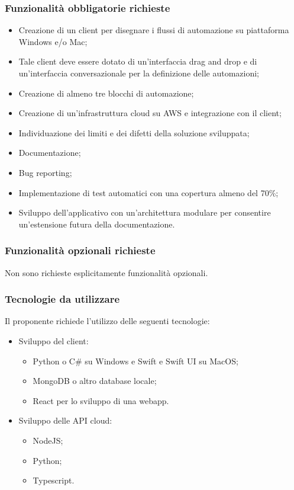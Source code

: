 \documentclass[10pt]{article}
\begin{document}
\subsubsection{Funzionalità obbligatorie richieste}
\begin{itemize}
    \item Creazione di un client per disegnare i flussi di automazione su piattaforma Windows e/o Mac;
    \item Tale client deve essere dotato di un’interfaccia drag and drop e di un’interfaccia conversazionale per la definizione delle automazioni;
    \item Creazione di almeno tre blocchi di automazione;
    \item Creazione di un’infrastruttura cloud su AWS e integrazione con il client;
    \item Individuazione dei limiti e dei difetti della soluzione sviluppata;
    \item Documentazione;
    \item Bug reporting;
    \item Implementazione di test automatici con una copertura almeno del 70\%;
    \item Sviluppo dell’applicativo con un’architettura modulare per consentire un’estensione futura della documentazione.
\end{itemize}
\subsubsection{Funzionalità opzionali richieste}
Non sono richieste esplicitamente funzionalità opzionali.
\subsubsection{Tecnologie da utilizzare}
Il proponente richiede l’utilizzo delle seguenti tecnologie:
\begin{itemize}
    \item Sviluppo del client: 
    \begin{itemize}
        \item Python o C\# su Windows e Swift e Swift UI su MacOS;
        \item MongoDB o altro database locale;
        \item React per lo sviluppo di una webapp.
    \end{itemize}
    \item Sviluppo delle API cloud: 
    \begin{itemize}
        \item NodeJS;
        \item Python;
        \item Typescript.
    \end{itemize}
\end{itemize}
\end{document}
